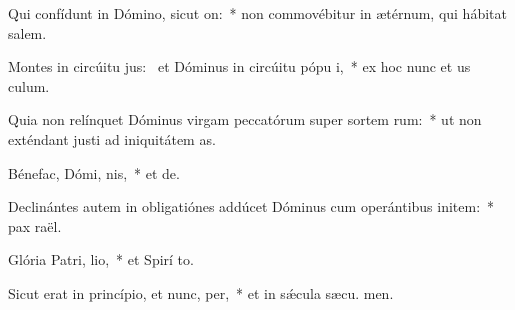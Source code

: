 \item Qui confídunt in Dómino, sicut  on:~* non commovébitur in ætérnum, qui hábitat  salem.
\item Montes in circúitu jus:~\pscross{} et Dóminus in circúitu pópu i,~* ex hoc nunc et us  culum.
\item Quia non relínquet Dóminus virgam peccatórum super sortem rum:~* ut non exténdant justi ad iniquitátem  as.
\item Bénefac, Dómi, nis,~* et  de.
\item Declinántes autem in obligatiónes addúcet Dóminus cum operántibus initem:~* pax  raël.
\item Glória Patri,  lio,~* et Spirí to.
\item Sicut erat in princípio, et nunc,  per,~* et in sǽcula sæcu. men.

